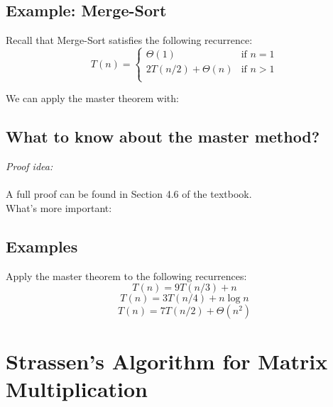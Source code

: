 \documentclass[11  pt]{article}
\begin{document}
\subsection{Example: Merge-Sort}

Recall that Merge-Sort satisfies the following recurrence:
\begin{equation}
	T(n) = \begin{cases}
		\Theta(1) & \text{if $n = 1$} \\
		2T(n/2) + \Theta(n) & \text{if $n > 1$} \\
	\end{cases}
\end{equation}

We can apply the master theorem with:\\

\vs{2cm} 

%

\subsection{What to know about the master method?}

\emph{Proof idea:} \\ \\%

A full proof can be found in Section 4.6 of the textbook. \\


What's more important:  %

\subsection{Examples}
Apply the master theorem to the following recurrences:
\begin{equation}
	T(n) = 9 T(n/3) + n
\end{equation}
\begin{equation}
	T(n) = 3 T(n/4) + n \log n
\end{equation}
\begin{equation}
	T(n) = 7 T(n/2) + \Theta(n^2)
\end{equation}
\newpage

\section{Strassen's Algorithm for Matrix Multiplication}
\end{document}
